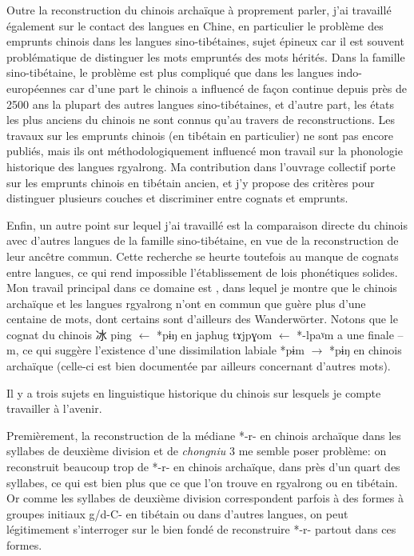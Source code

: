 \documentclass[oldfontcommands,oneside,a4paper,11pt]{memoir}
\newcommand{\ipa}[1]{{\phon #1}} %
\newcommand{\zh}[1]{{\cn #1}}
\begin{document}
Outre la reconstruction du chinois archaïque à proprement parler, j'ai travaillé également sur le contact des langues en Chine, en particulier le problème des emprunts chinois dans les langues sino-tibétaines, sujet épineux car il est souvent problématique de distinguer les mots empruntés des mots hérités. Dans la famille sino-tibétaine, le problème est plus compliqué que dans les langues indo-européennes car d’une part le chinois a influencé de façon continue depuis près de 2500 ans la plupart des autres langues sino-tibétaines, et d’autre part, les états les plus anciens du chinois ne sont connus qu’au travers de reconstructions. Les travaux sur les emprunts chinois (en tibétain en particulier) ne sont pas encore publiés, mais ils ont méthodologiquement influencé mon travail sur la phonologie historique des langues rgyalrong. Ma contribution dans l'ouvrage collectif \citet{jacques13jieci} porte sur les emprunts chinois en tibétain ancien, et j'y propose des critères pour distinguer plusieurs couches et discriminer entre cognats et emprunts.

Enfin, un autre point sur lequel j'ai travaillé est la comparaison directe du chinois avec d'autres langues de la famille sino-tibétaine, en vue de la reconstruction de leur ancêtre commun. Cette recherche se heurte toutefois au manque de cognats entre langues, ce qui rend impossible l'établissement de lois phonétiques solides. Mon travail principal dans ce domaine est \citet{jacques05}, dans lequel je montre que le chinois archaïque et les langues rgyalrong n'ont en commun que guère plus d'une centaine de mots, dont certains sont d'ailleurs des Wanderwörter. Notons que le cognat du chinois \zh{冰} ping $\leftarrow$ *pɨŋ en japhug \ipa{tɤjpɣom} $\leftarrow$ *-lpaˠm a une finale --m, ce qui suggère l'existence d'une dissimilation labiale *pɨm $\rightarrow $ *pɨŋ en chinois archaïque (celle-ci est bien documentée par ailleurs concernant d'autres mots).

 
Il y a trois sujets en linguistique historique du chinois sur lesquels je compte travailler à l'avenir.

Premièrement,   la reconstruction de la médiane *-r- en chinois archaïque dans les syllabes de deuxième division et de \textit{chongniu} 3 me semble poser problème: on reconstruit beaucoup trop de *-r- en chinois archaïque, dans près d'un quart des syllabes, ce qui est bien plus que ce que l'on trouve en rgyalrong ou en tibétain. Or comme les syllabes de deuxième division correspondent parfois à des formes à groupes initiaux g/d-C- en tibétain ou dans d'autres langues, on peut légitimement s'interroger sur le bien fondé de reconstruire *-r- partout dans ces formes. 
\end{document}
